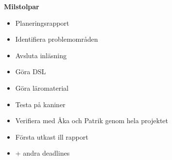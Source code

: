\documentclass[12pt,a4paper]{scrartcl}
\begin{document}
\textbf{Milstolpar}

\begin{itemize}
    \item Planeringsrapport
    \item Identifiera problemområden
    \item Avsluta inläsning
    \item Göra DSL
    \item Göra läromaterial
    \item Testa på kaniner
    \item Verifiera med  Åka och Patrik genom hela projektet
    \item Första utkast ill rapport
    \item + andra deadlines
\end{itemize}
\end{document}
